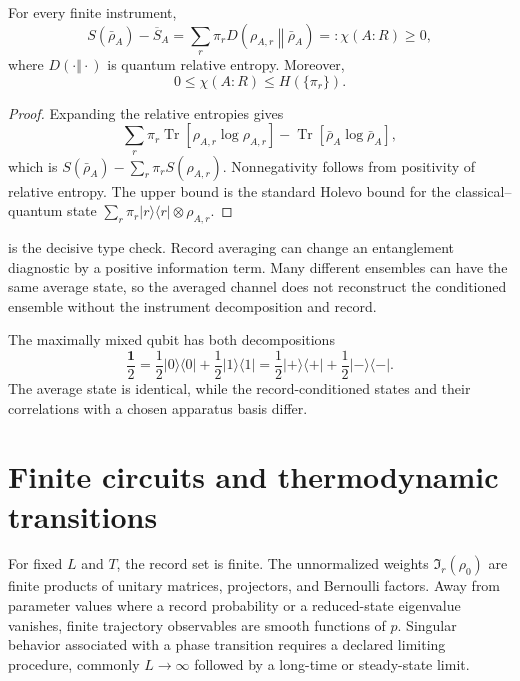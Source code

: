 \documentclass[11pt]{article}
\DeclareMathOperator{\Tr}{Tr}
\newcommand{\Inst}{\mathfrak I}
\newcommand{\id}{\mathbf 1}
\begin{document}
\begin{theorem}\label{thm:holevo}
For every finite instrument,
\begin{equation}\label{eq:holevo}
 S(\bar\rho_A)-\overline S_A
 =
 \sum_r\pi_r
 D\!\left(\rho_{A,r}\middle\Vert\bar\rho_A\right)
 =:\chi(A{:}R)\geq0 ,
\end{equation}
where $D(\cdot\Vert\cdot)$ is quantum relative entropy.  Moreover,
\[
 0\leq\chi(A{:}R)\leq H(\{\pi_r\}).
\]
\end{theorem}

\begin{proof}
Expanding the relative entropies gives
\[
\sum_r\pi_r\Tr[\rho_{A,r}\log\rho_{A,r}]
-\Tr[\bar\rho_A\log\bar\rho_A],
\]
which is $S(\bar\rho_A)-\sum_r\pi_rS(\rho_{A,r})$.
Nonnegativity follows from positivity of relative entropy.  The upper
bound is the standard Holevo bound for the classical--quantum state
$\sum_r\pi_r|r\rangle\langle r|\otimes\rho_{A,r}$.
\end{proof}

 is the decisive type check.  Record averaging can
change an entanglement diagnostic by a positive information term.  Many
different ensembles can have the same average state, so the averaged
channel does not reconstruct the conditioned ensemble without the
instrument decomposition and record.

\begin{example}\label{ex:ensembles}
The maximally mixed qubit has both decompositions
\[
\frac{\id}{2}
=\frac12|0\rangle\langle0|+\frac12|1\rangle\langle1|
=\frac12|+\rangle\langle+|+\frac12|-\rangle\langle-|.
\]
The average state is identical, while the record-conditioned states and
their correlations with a chosen apparatus basis differ.
\end{example}

\section{Finite circuits and thermodynamic transitions}

For fixed $L$ and $T$, the record set is finite.  The unnormalized
weights $\Inst_r(\rho_0)$ are finite products of unitary matrices,
projectors, and Bernoulli factors.  Away from parameter values where a
record probability or a reduced-state eigenvalue vanishes, finite
trajectory observables are smooth functions of $p$.  Singular behavior
associated with a phase transition requires a declared limiting
procedure, commonly $L\to\infty$ followed by a long-time or steady-state
limit.
\end{document}
